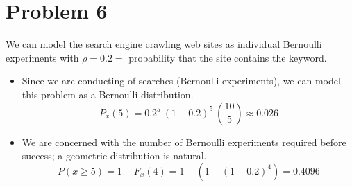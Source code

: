 \documentclass[11pt]{article}
\begin{document}
\section*{Problem 6}
We can model the search engine crawling web sites as individual Bernoulli experiments with $\rho = 0.2 = $ probability that the site contains the keyword.
	\begin{itemize}
	\item
	Since we are conducting of searches (Bernoulli experiments), we can model this problem as a Bernoulli distribution. 
	\[ P_x(5) = 0.2^5\ (1-0.2)^5\ \binom{10}{5}  \approx 0.026\]
	
	\item 
	We are concerned with the number of Bernoulli experiments required before success; a geometric distribution is natural.
	\[P(x \ge 5) = 1- F_x(4) = 1 -(1- (1-0.2)^4) = 0.4096 \]
	
	\end{itemize}
\end{document}
